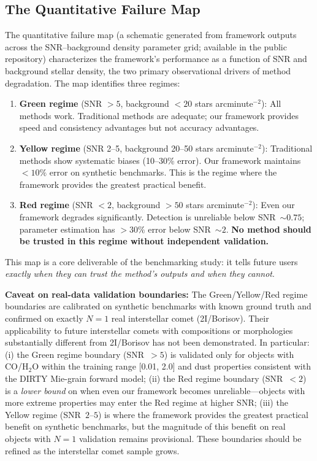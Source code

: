 \documentclass[usenatbib]{mnras}
\begin{document}
\subsection{The Quantitative Failure Map}\label{sec:failure_map}

The quantitative failure map (a schematic generated from framework outputs across the SNR--background density parameter grid; available in the public repository) characterizes the framework's performance as a function of SNR and background stellar density, the two primary observational drivers of method degradation. The map identifies three regimes:

\begin{enumerate}
    \item \textbf{Green regime} (SNR $>5$, background $<20$ stars arcminute$^{-2}$): All methods work. Traditional methods are adequate; our framework provides speed and consistency advantages but not accuracy advantages.
    \item \textbf{Yellow regime} (SNR 2--5, background 20--50 stars arcminute$^{-2}$): Traditional methods show systematic biases (10--30\% error). Our framework maintains $<10\%$ error on synthetic benchmarks. This is the regime where the framework provides the greatest practical benefit.
    \item \textbf{Red regime} (SNR $<2$, background $>50$ stars arcminute$^{-2}$): Even our framework degrades significantly. Detection is unreliable below SNR~$\sim 0.75$; parameter estimation has $>30\%$ error below SNR~$\sim 2$. \textbf{No method should be trusted in this regime without independent validation.}
\end{enumerate}

This map is a core deliverable of the benchmarking study: it tells future users \textit{exactly when they can trust the method's outputs and when they cannot}.

\textbf{Caveat on real-data validation boundaries:} The Green/Yellow/Red regime boundaries are calibrated on synthetic benchmarks with known ground truth and confirmed on exactly $N=1$ real interstellar comet (2I/Borisov). Their applicability to future interstellar comets with compositions or morphologies substantially different from 2I/Borisov has not been demonstrated. In particular: (i) the Green regime boundary (SNR~$>5$) is validated only for objects with CO/H$_2$O within the training range [0.01, 2.0] and dust properties consistent with the DIRTY Mie-grain forward model; (ii) the Red regime boundary (SNR~$<2$) is a \textit{lower bound} on when even our framework becomes unreliable---objects with more extreme properties may enter the Red regime at higher SNR; (iii) the Yellow regime (SNR~$2$--$5$) is where the framework provides the greatest practical benefit on synthetic benchmarks, but the magnitude of this benefit on real objects with $N=1$ validation remains provisional. These boundaries should be refined as the interstellar comet sample grows.
\end{document}
